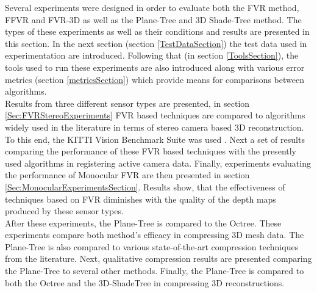 Several experiments were designed in order to evaluate both the FVR method, FFVR and FVR-3D as well as the Plane-Tree and 3D Shade-Tree method. The types of these experiments as well as their conditions and results are presented in this section. In the next section (section \ref{TestDataSection}) the test data used in experimentation are introduced. Following that (in section \ref{ToolsSection}), the tools used to run these experiments are also introduced along with various error metrics (section \ref{metricsSection}) which provide means for comparisons between algorithms. \\

Results from three different sensor types are presented, in section \ref{Sec:FVRStereoExperiments} FVR based techniques are compared to algorithms widely used in the literature in terms of stereo camera based 3D reconstruction. To this end, the KITTI Vision Benchmark Suite was used \cite{Geiger13Vision}. Next a set of results comparing the performance of these FVR based techniques with the presently used algorithms in registering active camera data. Finally, experiments evaluating the performance of Monocular FVR are then presented in section \ref{Sec:MonocularExperimentsSection}. Results show, that the effectiveness of techniques based on FVR diminishes with the quality of the depth maps produced by these sensor types. \\

After these experiments, the Plane-Tree is compared to the Octree. These experiments compare both method's efficacy in compressing 3D mesh data. The Plane-Tree is also compared to various state-of-the-art compression techniques from the literature. Next, qualitative compression results are presented comparing the Plane-Tree to several other methods. Finally, the Plane-Tree is compared to both the Octree and the 3D-ShadeTree in compressing 3D reconstructions. \\
